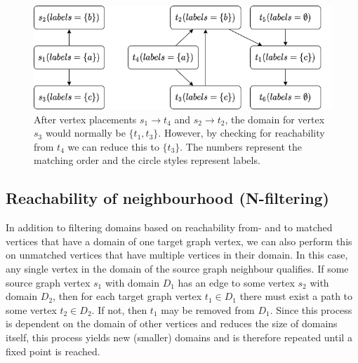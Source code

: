 \begin{figure}
\centering

\includegraphics[scale=0.6]{images/contraction/pruningExample.png}

\caption{After vertex placements $s_1 \to t_4$ and $s_2 \to t_2$, the domain for vertex $s_3$ would normally be $\{t_1, t_3\}$. However, by checking for reachability from $t_4$ we can reduce this to $\{t_3\}$. The numbers represent the matching order and the circle styles represent labels.}
\label{fig:reachability-filtered}
\end{figure}
\subsection{Reachability of neighbourhood \hspace{12pt}(N-filtering)}
In addition to filtering domains based on reachability from- and to matched vertices that have a domain of one target graph vertex, we can also perform this on unmatched vertices that have multiple vertices in their domain. In this case, any single vertex in the domain of the source graph neighbour qualifies. If some source graph vertex $s_1$ with domain $D_1$ has an edge to some vertex $s_2$ with domain $D_2$, then for each target graph vertex $t_1 \in D_1$ there must exist a path to some vertex $t_2 \in D_2$. If not, then $t_1$ may be removed from $D_1$. Since this process is dependent on the domain of other vertices and reduces the size of domains itself, this process yields new (smaller) domains and is therefore repeated until a fixed point is reached.

